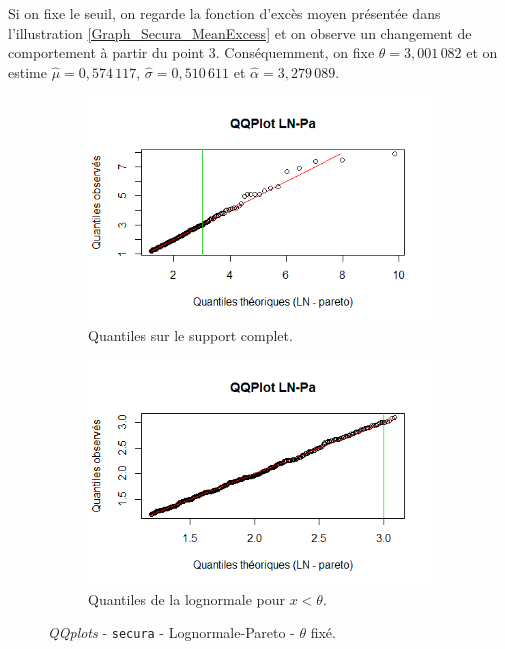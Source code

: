 		Si on fixe le seuil, on regarde la fonction d'excès moyen présentée dans l'illustration \ref{Graph_Secura_MeanExcess} et on observe un changement de comportement à partir du point $3$. Conséquemment, on fixe $\theta = 3,001\,082$ et on estime $\hat{\mu} =0,574\,117$, $\hat{\sigma}=0,510\,611$ et $\hat{\alpha} = 3,279\,089$.
		
		\begin{figure}[H]
			\begin{center}
				\begin{subfigure}[b]{0.45\textwidth}
					\includegraphics[scale=0.65]{Graphiques/QQ_LN_PA_choix_secura} 
					\caption{Quantiles sur le support complet.} \label{QQplot_LN_Pa_choix_secrua}
				\end{subfigure}
				\begin{subfigure}[b]{0.4\textwidth}
					\includegraphics[scale=0.65]{Graphiques/QQ_LN_PA_choix_t1_secura} 
					\caption{Quantiles de la lognormale pour $x<\theta$.} \label{QQplot_LN_Pa_choix_2_secrua}
				\end{subfigure}
				\renewcommand{\figurename}{Illustration}
				\caption{\textit{QQplots} - \texttt{secura} - Lognormale-Pareto - $\theta$ fixé.}
			\end{center}
		\end{figure}
		
